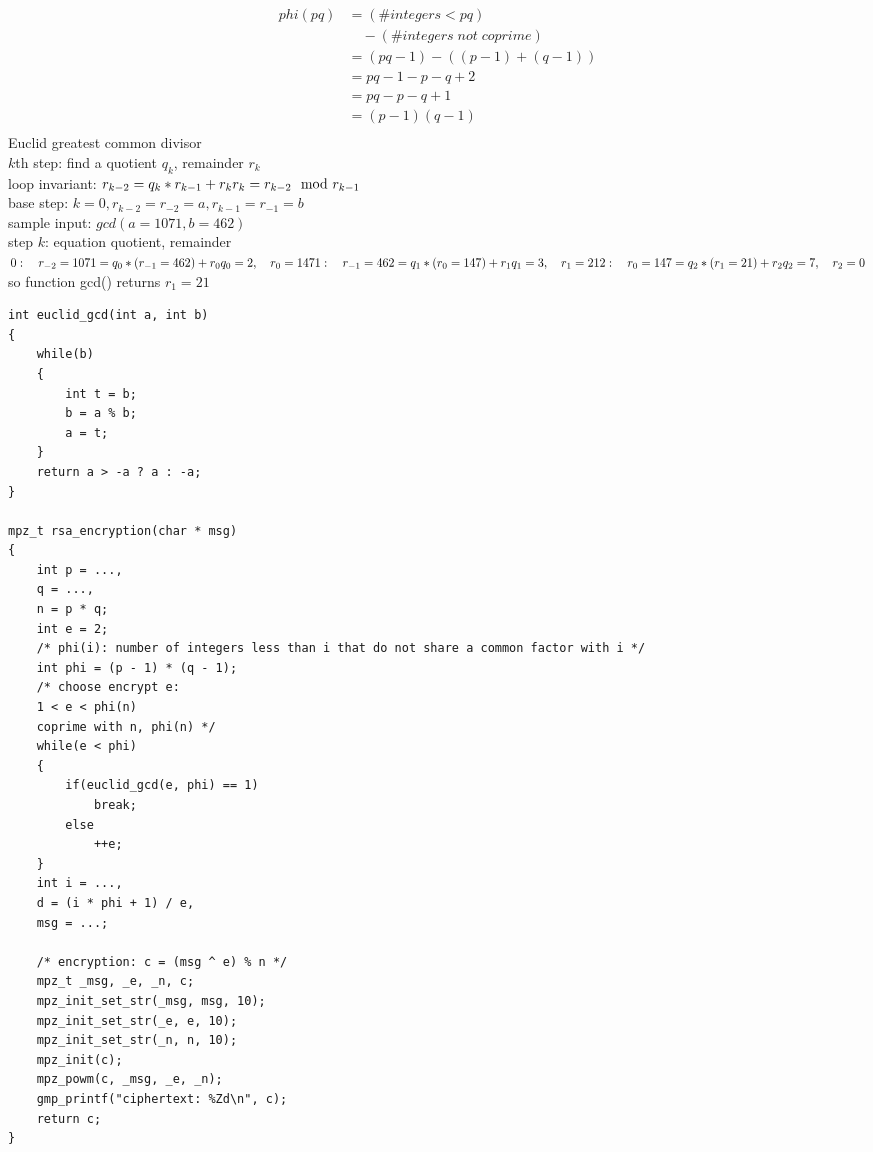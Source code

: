 \documentclass[12pt, border = 4pt, multi]{article} %
\begin{document}
\begin{multicols}{2}
\begin{align*}
phi(pq) &= (\#integers < pq)\\
&\quad- (\#integers\;not\;coprime)\\
&= (pq - 1) - ((p - 1) + (q - 1))\\
&= pq - 1 - p - q + 2\\
&= pq - p - q + 1\\
&= (p - 1)(q - 1)\\
\end{align*}
Euclid greatest common divisor\\
$k$th step: find a quotient $q_k$, remainder $r_k$\\
loop invariant: $r_{k - 2} = q_k * r_{k - 1} + r_k\\
r_k = r_{k - 2} \mod r_{k - 1}$\\
base step: $k = 0, r_{k - 2} = r_{-2} = a, r_{k - 1} = r_{-1} = b$\\
sample input: $gcd(a = 1071, b = 462)$\\
step $k$: equation quotient, remainder\\
$0:\quad r_{-2} = 1071 = q_0 * (r_{-1} = 462) + r_0 q_0 = 2,\quad r_0 = 147\\
1:\quad r_{-1} = 462 = q_1 * (r_0 = 147) + r_1 q_1 = 3,\quad r_1 = 21\\
2:\quad r_0 = 147 = q_2 * (r_1 = 21) + r_2 q_2 = 7,\quad r_2 = 0$\\
so function gcd() returns $r_1 = 21$
\begin{lstlisting}[morekeywords = {mpz_t}]
int euclid_gcd(int a, int b)
{
    while(b)
    {
        int t = b;
        b = a % b;
        a = t; 
    }
    return a > -a ? a : -a;
}

mpz_t rsa_encryption(char * msg)
{
	int p = ...,
	q = ...,
	n = p * q;
	int e = 2;
	/* phi(i): number of integers less than i that do not share a common factor with i */
	int phi = (p - 1) * (q - 1);
	/* choose encrypt e:
	1 < e < phi(n)
	coprime with n, phi(n) */
	while(e < phi)
	{
		if(euclid_gcd(e, phi) == 1)
			break;
		else
			++e;
	}
	int i = ...,
	d = (i * phi + 1) / e,
	msg = ...;

	/* encryption: c = (msg ^ e) % n */
	mpz_t _msg, _e, _n, c; 
	mpz_init_set_str(_msg, msg, 10);
	mpz_init_set_str(_e, e, 10);
	mpz_init_set_str(_n, n, 10);
	mpz_init(c);
	mpz_powm(c, _msg, _e, _n);
	gmp_printf("ciphertext: %Zd\n", c);
	return c;
}


\end{lstlisting}
\end{multicols}
\end{document}
